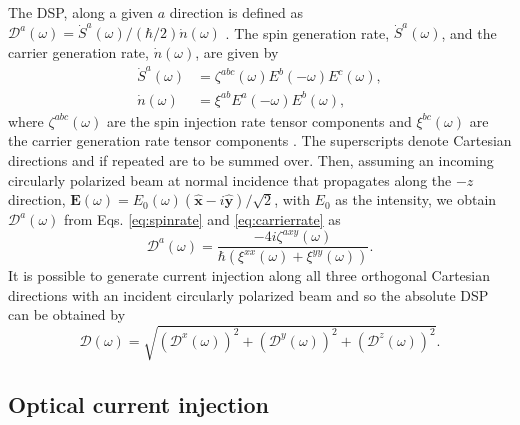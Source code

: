 \documentclass[pss]{wiley2sp} %
\begin{document}
The DSP, along a given $a$ direction is
defined as
$\mathcal{D}^{a}(\omega)=\dot{S}^{a}(\omega)/(\hbar/2)\dot{n}(\omega)$
\cite{mendozaPRB12}. The spin generation rate, $\dot{S}^{a}(\omega)$, and the
carrier generation rate, $\dot{n}(\omega)$, are given by
\begin{align}
\dot{S}^{a}(\omega)&= 
\zeta^{abc}(\omega)E^{b}(-\omega)E^{c}(\omega), \label{eq:spinrate} \\
\dot{n}(\omega)&= 
\xi^{ab}E^{a}(-\omega)E^{b}(\omega), \label{eq:carrierrate}
\end{align}
where $\zeta^{abc}(\omega)$ are the spin injection rate tensor components and
$\xi^{bc}(\omega)$ are the carrier generation rate tensor components
\cite{arzatePRB14}. The superscripts denote Cartesian directions and if repeated
are to be summed over. Then, assuming an incoming circularly polarized beam at
normal incidence that propagates along the $-z$ direction, $\mathbf{E}(\omega) =
E_{0}(\omega)(\mathbf{\hat{x}} - i\mathbf{\hat{y}})/\sqrt{2}$, with $E_{0}$ as
the intensity, we obtain $\mathcal{D}^{a}(\omega)$ from Eqs.
\eqref{eq:spinrate} and \eqref{eq:carrierrate} \cite{arzatePRB14} as
\begin{equation}\label{eq:D^i}
\mathcal{D}^{a}(\omega) =  
\frac{-4i\zeta^{axy}(\omega)}
    {\hbar\left(\xi^{xx}(\omega) + \xi^{yy}(\omega)\right)}.
\end{equation}
It is possible to generate current injection along all three orthogonal
Cartesian directions with an incident circularly polarized beam and so the
absolute DSP can be obtained \cite{arzatePRB14} by 
\begin{equation}\label{eq:dsptotal}
\mathcal{D}(\omega) =
\sqrt{(\mathcal{D}^{x}(\omega))^{2} + 
      (\mathcal{D}^{y}(\omega))^{2} +
      (\mathcal{D}^{z}(\omega))^{2}
      }.
\end{equation}


\subsection{Optical current injection}\label{sec:theory-OCI}
\end{document}
